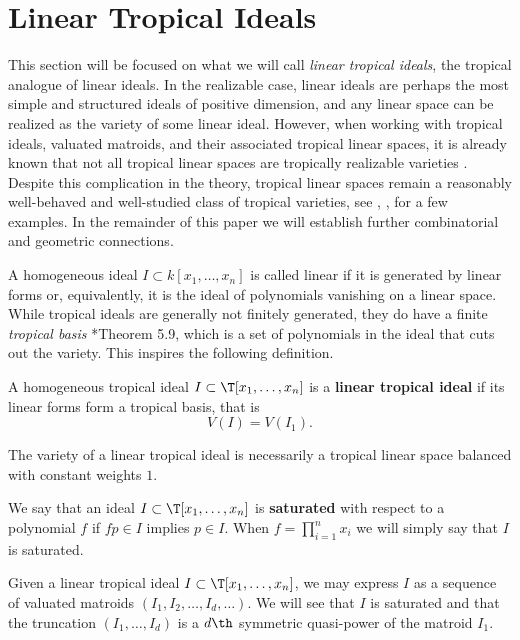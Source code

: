\section{Linear Tropical Ideals}\label{sec:LinTropIdeals}
 

   This section will be focused on what we will call \textit{linear tropical ideals}, the tropical analogue of linear ideals. In the realizable case, linear ideals are perhaps the most simple and structured ideals of positive dimension, and any linear space can be realized as the variety of some linear ideal. However, when working with tropical ideals, valuated matroids, and their associated tropical linear spaces, it is already known that not all tropical linear spaces are tropically realizable varieties \cite{DR19}. Despite this complication in the theory, tropical linear spaces remain a reasonably well-behaved and well-studied class of tropical varieties, see \cite{Speyer08}, \cite{FR15}, \cite{GG18} for a few examples. In the remainder of this paper we will establish further combinatorial and geometric connections.
   
   A homogeneous ideal $I\subset k[x_1,\dots,x_n]$ is called linear if it is generated by linear forms or, equivalently, it is the ideal of polynomials vanishing on a linear space. While tropical ideals are generally not finitely generated, they do have a finite \textit{tropical basis} \cite{MR18}*{Theorem 5.9}, which is a set of polynomials in the ideal that cuts out the variety. This inspires the following definition.
   
    \begin{definition}    
    A homogeneous tropical ideal $I\subset \T[x_1,\dots, x_n]$ is a \textbf{linear tropical ideal} if its linear forms form a tropical basis, that is
    $$V(I)= V(I_1).$$
    \end{definition}
    The variety of a linear tropical ideal is necessarily a tropical linear space balanced with constant weights $1$.

    We say that an ideal $I\subset \T[x_1,\dots,x_n]$ is \textbf{saturated} with respect to a polynomial $f$ if $fp\in I$ implies $p\in I$. When $f=\prod_{i=1}^n x_i$ we will simply say that $I$ is saturated.
    
    \begin{remark}\label{rem:linSaturated}
    Given a linear tropical ideal $I\subset \T[x_1,\dots, x_n]$, we may express $I$ as a sequence of valuated matroids $(I_1,I_2,\dots,I_d,\dots)$. We will see that $I$ is saturated and that the truncation $(I_1,\dots,I_d)$ is a $d\th$ symmetric quasi-power of the matroid $I_1$.
    \end{remark}

